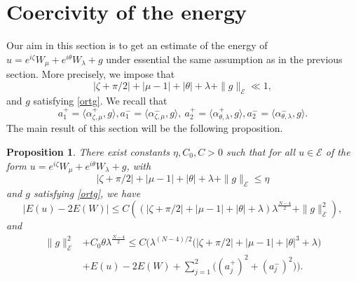 \documentclass[a4paper,two-side,10pt]{amsart}
\newtheorem{prop}{Proposition}[section]
\newcommand{\R}{\mathbb{R}}
\numberwithin{equation}{section}
\begin{document}
\section{Coercivity of the energy}

Our aim in this section is to get an estimate of the energy of $u= e^{i\zeta} W_\mu + e^{i\theta } W_\lambda +g$ under essential the same assumption as in the previous section. More precisely, we impose that  
\begin{equation}
\label{smallpara}
|\zeta + \pi /2| +|\mu -1| +|\theta | +\lambda +\|g\|_{\mathcal{E}} \ll 1,
\end{equation}
and $g$ satisfying \eqref{ortg}. We recall that
$$a_1^+ = \langle \alpha_{\zeta ,\mu}^+ ,g\rangle , a_1^- = \langle \alpha_{\zeta ,\mu}^- ,g\rangle,\ a_2^+ = \langle \alpha_{\theta ,\lambda}^+ ,g\rangle , a_2^- = \langle \alpha_{\theta ,\lambda}^- ,g \rangle .$$
The main result of this section will be the following proposition.
\begin{prop}
\label{ener}
 There exist constants $\eta ,C_0,C>0$ such that for all $u\in \mathcal{E}$ of the form $u= e^{i\zeta} W_\mu + e^{i\theta } W_\lambda +g$,
with 
\begin{equation}\label{eta}
|\zeta + \pi /2| +|\mu -1| +|\theta | +\lambda +\|g\|_{\mathcal{E}}\le\eta
\end{equation}  
and $g$ satisfying \eqref{ortg},
  we have
\begin{equation}
\label{propenere1}
|E(u)-2E(W)|\leq C \left((|\zeta +\pi /2| +|\mu -1| +|\theta| +\lambda )\lambda^{\frac{N-4}{2}} +\|g\|_{\mathcal{E}}^2 \right), 
\end{equation}
and
\begin{align}
\label{propenere2}
\|g\|_{\mathcal{E}}^2 &+C_0 \theta \lambda^{\frac{N-4}{2}} \leq C \Big(\lambda^{(N-4)/2} \big(|\zeta +\pi /2| +|\mu -1|+|\theta|^3 +\lambda\big) \nonumber\\
&+E(u) - 2E(W) +\sum_{j=1}^2 \big((a_j^+)^2 + (a_j^- )^2 \big)\Big).
\end{align}
\end{prop}
\end{document}
